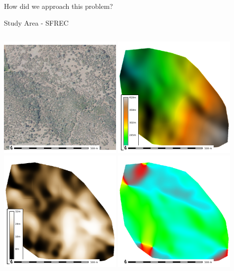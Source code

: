 \documentclass[
  ignorenonframetext,
]{beamer}
\begin{document}
\begin{frame}[fragile]{How did we approach this problem?}
\begin{block}{Study Area - SFREC}
\label{study-area---sfrec}
\begin{columns}[T]
\begin{column}{0.5\textwidth}
\includegraphics[width=0.45\textwidth,height=\textheight]{../output/SFREC//naip.png}
\includegraphics[width=0.45\textwidth,height=\textheight]{../output/SFREC/elev.png}
\includegraphics[width=0.45\textwidth,height=\textheight]{../output/SFREC/slope.png}
\includegraphics[width=0.45\textwidth,height=\textheight]{../output/SFREC/aspect.png}
\end{column}


\end{columns}
\end{block}
\end{frame}
\end{document}
